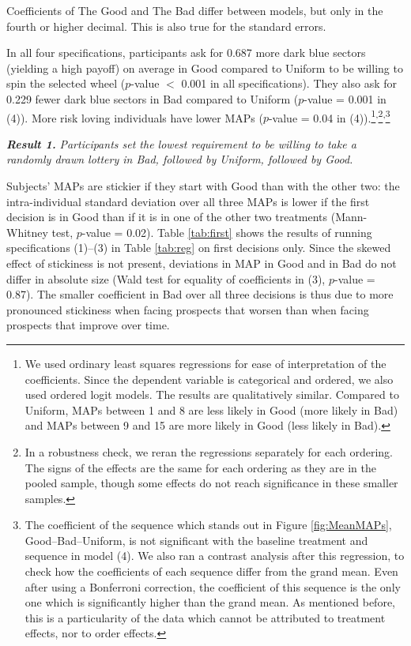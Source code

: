 \documentclass[pdftex,12pt, a4paper]{article}
\begin{document}
\begin{table}[htbp]
\begin{adjustbox}{width=\textwidth}
\begin{threeparttable}
\begin{tablenotes}
Coefficients of The Good and The Bad differ between models, but only in the fourth or higher decimal.
This is also true for the standard errors.
\end{tablenotes}
\end{threeparttable}
\end{adjustbox}
\end{table}

In all four specifications, participants ask for 0.687 more dark blue sectors (yielding a high payoff) on average in Good compared to Uniform to be willing to spin the selected wheel ($p$-value $<$ 0.001 in all specifications).
They also ask for 0.229 fewer dark blue sectors in Bad compared to Uniform ($p$-value = 0.001 in (4)).
More risk loving individuals have lower MAPs ($p$-value = 0.04 in (4)).\footnote{
	We used ordinary least squares regressions for ease of interpretation of the coefficients.
	Since the dependent variable is categorical and ordered, we also used ordered logit models.
	The results are qualitatively similar.
	Compared to Uniform, MAPs between 1 and 8 are less likely in Good (more likely in Bad) and MAPs between 9 and 15 are more likely in Good (less likely in Bad).
}\textsuperscript{,}\footnote{
	In a robustness check, we reran the regressions separately for each ordering.
	The signs of the effects are the same for each ordering as they are in the pooled sample, though some effects do not reach significance in these smaller samples.
}\textsuperscript{,}\footnote{
The coefficient of the sequence which stands out in Figure \ref{fig:MeanMAPs}, Good--Bad--Uniform, is not significant with the baseline treatment and sequence in model (4).
We also ran a contrast analysis after this regression, to check how the coefficients of each sequence differ from the grand mean.
Even after using a Bonferroni correction, the coefficient of this sequence is the only one which is significantly higher than the grand mean.
As mentioned before, this is a particularity of the data which cannot be attributed to treatment effects, nor to order effects.
}

\textbf{\textit{Result 1.}} \textit{Participants set the lowest requirement to be willing to take a randomly drawn lottery in Bad, followed by Uniform, followed by Good.}

Subjects' MAPs are stickier if they start with Good than with the other two: the intra-individual standard deviation over all three MAPs is lower if the first decision is in Good than if it is in one of the other two treatments (Mann-Whitney test, $p$-value = 0.02).
Table \ref{tab:first} shows the results of running specifications (1)--(3) in Table \ref{tab:reg} on first decisions only.
Since the skewed effect of stickiness is not present, deviations in MAP in Good and in Bad do not differ in absolute size (Wald test for equality of coefficients in (3), $p$-value = 0.87).
The smaller coefficient in Bad over all three decisions is thus due to more pronounced stickiness when facing prospects that worsen than when facing prospects that improve over time.
\end{document}
